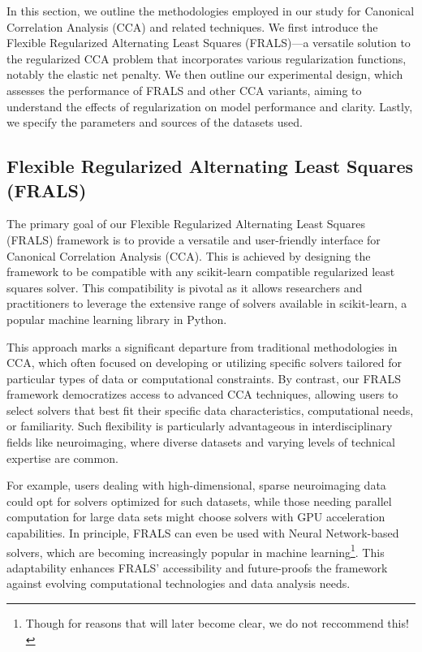 In this section, we outline the methodologies employed in our study for Canonical Correlation Analysis (CCA) and related techniques.
We first introduce the Flexible Regularized Alternating Least Squares (FRALS)—a versatile solution to the regularized CCA problem that incorporates various regularization functions, notably the elastic net penalty\citep{zou2005regularization}.
We then outline our experimental design, which assesses the performance of FRALS and other CCA variants, aiming to understand the effects of regularization on model performance and clarity.
Lastly, we specify the parameters and sources of the datasets used.

\subsection{Flexible Regularized Alternating Least Squares (FRALS)}\label{subsec:flexible-regularized-alternating-least-squares-(frals)}

The primary goal of our Flexible Regularized Alternating Least Squares (FRALS) framework is to provide a versatile and user-friendly interface for Canonical Correlation Analysis (CCA). This is achieved by designing the framework to be compatible with any scikit-learn compatible regularized least squares solver. This compatibility is pivotal as it allows researchers and practitioners to leverage the extensive range of solvers available in scikit-learn, a popular machine learning library in Python.

This approach marks a significant departure from traditional methodologies in CCA, which often focused on developing or utilizing specific solvers tailored for particular types of data or computational constraints. By contrast, our FRALS framework democratizes access to advanced CCA techniques, allowing users to select solvers that best fit their specific data characteristics, computational needs, or familiarity. Such flexibility is particularly advantageous in interdisciplinary fields like neuroimaging, where diverse datasets and varying levels of technical expertise are common.

For example, users dealing with high-dimensional, sparse neuroimaging data could opt for solvers optimized for such datasets, while those needing parallel computation for large data sets might choose solvers with GPU acceleration capabilities.
In principle, FRALS can even be used with Neural Network-based solvers, which are becoming increasingly popular in machine learning\footnote{Though for reasons that will later become clear, we do not reccommend this!}.
This adaptability enhances FRALS' accessibility and future-proofs the framework against evolving computational technologies and data analysis needs.

